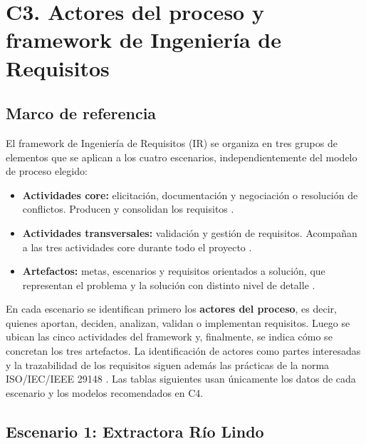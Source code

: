 

\section{C3. Actores del proceso y framework de Ingeniería de Requisitos}

\subsection{Marco de referencia}

El framework de Ingeniería de Requisitos (IR) \cite{Pohl2025,RuppPohl2015} se organiza en tres grupos de elementos que se aplican a los cuatro escenarios, independientemente del modelo de proceso elegido:

\begin{itemize}
    \item \textbf{Actividades core:} elicitación, documentación y negociación o resolución de conflictos. Producen y consolidan los requisitos \cite{Pohl2025}.
    \item \textbf{Actividades transversales:} validación y gestión de requisitos. Acompañan a las tres actividades core durante todo el proyecto \cite{Pohl2025,SWEBOK_v4_2024}.
    \item \textbf{Artefactos:} metas, escenarios y requisitos orientados a solución, que representan el problema y la solución con distinto nivel de detalle \cite{Pohl2025}.
\end{itemize}

En cada escenario se identifican primero los \textbf{actores del proceso}, es decir, quienes aportan, deciden, analizan, validan o implementan requisitos. Luego se ubican las cinco actividades del framework y, finalmente, se indica cómo se concretan los tres artefactos. La identificación de actores como partes interesadas y la trazabilidad de los requisitos siguen además las prácticas de la norma ISO/IEC/IEEE 29148 \cite{ISO29148}. Las tablas siguientes usan únicamente los datos de cada escenario y los modelos recomendados en C4.

\subsection{Escenario 1: Extractora Río Lindo}

